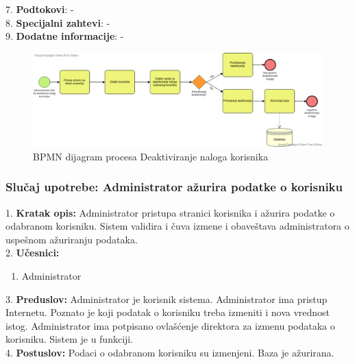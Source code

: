 \documentclass{article}
\begin{document}
7. \textbf{Podtokovi}: - \\

8. \textbf{Specijalni zahtevi}: - \\

9. \textbf{Dodatne informacije}: - \\


\begin{figure} [!ht]
    \begin{center}
        \includegraphics[scale=0.35]{imgs/BPMN_deaktivacija_naloga.png}
    \end{center}
\caption{BPMN dijagram procesa Deaktiviranje naloga korisnika}
\end{figure}



\subsubsection{Slučaj upotrebe: Administrator ažurira podatke o korisniku}
1. \textbf{Kratak opis:} Administrator pristupa stranici korisnika i ažurira podatke o odabranom korisniku. Sistem validira i čuva izmene i obaveštava administratora o uspešnom ažuriranju podataka. \\

2. \textbf{Učesnici:}
\begin{enumerate} [label=(\alph*)]
\item Administrator
\end{enumerate} 

3. \textbf{Preduslov:} Administrator je korisnik sistema. Administrator ima pristup Internetu. Poznato je koji podatak o korisniku treba izmeniti i nova vrednost istog. Administrator ima potpisano ovlašćenje direktora za izmenu podataka o korisniku. Sistem je u funkciji. \\

4. \textbf{Postuslov:} Podaci o odabranom korisniku su izmenjeni. Baza je ažurirana. \\
\end{document}
